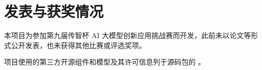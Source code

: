 \section{发表与获奖情况}\label{sec:awards}

本项目为参加第九届传智杯 AI 大模型创新应用挑战赛而开发，此前未以论文等形式公开发表，也未获得其他比赛或评选奖项。

项目使用的第三方开源组件和模型及其许可信息列于源码包的 。
